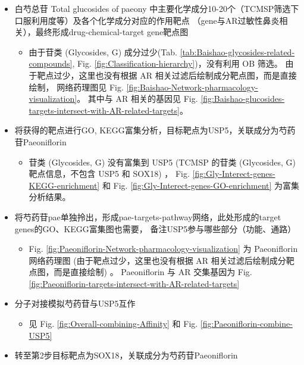 \documentclass[
]{article}
\providecommand{\tightlist}{%
  \setlength{\itemsep}{0pt}\setlength{\parskip}{0pt}}
\begin{document}
\begin{itemize}
\tightlist
\item
  白芍总苷 Total glucosides of paeony 中主要化学成分10-20个（TCMSP筛选下口服利用度等）及各个化学成分对应的作用靶点
  （gene与AR过敏性鼻炎相关），最终形成drug-chemical-target gene靶点图

  \begin{itemize}
  \tightlist
  \item
    由于苷类 (Glycosides, G) 成分过少(Tab. \ref{tab:Baishao-glycosides-related-compounds},
    Fig. \ref{fig:Classification-hierarchy})，没有利用 OB 筛选。
    由于靶点过少，这里也没有根据 AR 相关过滤后绘制成分靶点图，而是直接绘制，
    网络药理图见 Fig. \ref{fig:Baishao-Network-pharmacology-visualization}。
    其中与 AR 相关的基因见 Fig. \ref{fig:Baishao-glucosides-targets-intersect-with-AR-related-targets}。
  \end{itemize}
\item
  将获得的靶点进行GO, KEGG富集分析，目标靶点为USP5，关联成分为芍药苷Paeoniflorin

  \begin{itemize}
  \tightlist
  \item
    苷类 (Glycosides, G) 没有富集到 USP5 (TCMSP 的苷类 (Glycosides, G) 靶点信息，不包含 USP5 和 SOX18) ，
    Fig. \ref{fig:Gly-Interect-genes-KEGG-enrichment} 和 Fig. \ref{fig:Gly-Interect-genes-GO-enrichment} 为富集分析结果。
  \end{itemize}
\item
  将芍药苷pae单独拎出，形成pae-targets-pathway网络，此处形成的target genes的GO、KEGG富集图也需要，
  备注USP5参与哪些部分（功能、通路）

  \begin{itemize}
  \tightlist
  \item
    Fig. \ref{fig:Paeoniflorin-Network-pharmacology-visualization} 为 Paeoniflorin 网络药理图
    (由于靶点过少，这里也没有根据 AR 相关过滤后绘制成分靶点图，而是直接绘制) 。
    Paeoniflorin 与 AR 交集基因为 Fig. \ref{fig:Paeoniflorin-targets-intersect-with-AR-related-targets}
  \end{itemize}
\item
  分子对接模拟芍药苷与USP5互作

  \begin{itemize}
  \tightlist
  \item
    见 Fig. \ref{fig:Overall-combining-Affinity} 和 Fig. \ref{fig:Paeoniflorin-combine-USP5}
  \end{itemize}
\item
  转至第2步目标靶点为SOX18，关联成分为芍药苷Paeoniflorin


\end{itemize}
\end{document}
